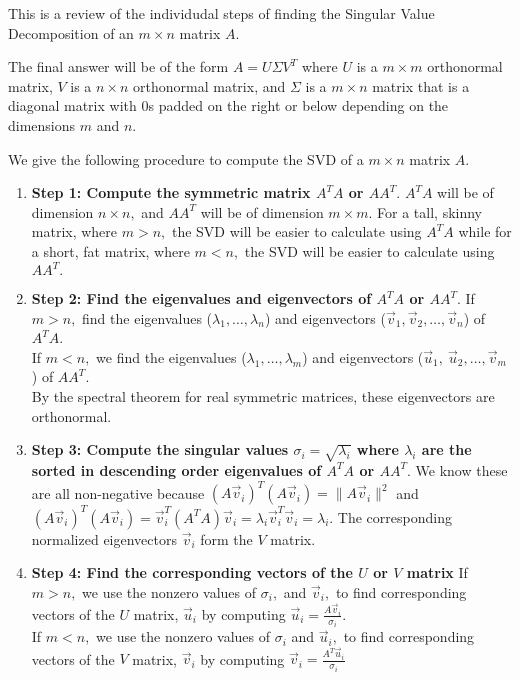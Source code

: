 

This is a review of the individudal steps of finding the Singular Value Decomposition of an $m \times n$ matrix $A.$

The final answer will be of the form $A = U \Sigma V^{T}$ where $U$ is a $m \times m$ orthonormal matrix, $V$ is a $n \times n$ orthonormal matrix, and $\Sigma$ is a $m \times n$ matrix that is a diagonal matrix with $0$s padded on the right or below depending on the dimensions $m$ and $n.$

We give the following procedure to compute the SVD of a $m \times n$ matrix $A.$

\begin{enumerate}[label=(\roman*)]
  \item \textbf{Step 1: Compute the symmetric matrix $A^{T} A$ or $A A^{T}.$} \vskip 1pt
  $A^{T}A$ will be of dimension $n \times n,$ and $AA^{T}$ will be of dimension $m \times m.$ \vskip 1pt
  For a tall, skinny matrix, where $m > n,$ the SVD will be easier to calculate using $A^{T}A$ while for a short, fat matrix, where $m < n,$ the SVD will be easier to calculate using $AA^{T}.$

  \item \textbf{Step 2: Find the eigenvalues and eigenvectors of $A^{T} A$ or $AA^{T}.$} \vskip 1pt
  If $m > n,$ find the eigenvalues ($\lambda_1, \ldots, \lambda_{n}$) and eigenvectors ($\vec{v}_1, \vec{v}_2, \ldots, \vec{v}_{n}$) of $A^TA$. \\
   If $m < n,$ we find the eigenvalues ($\lambda_1, \ldots, \lambda_{m}$) and eigenvectors ($\vec{u}_{1}, \ \vec{u}_{2}, \ldots, \vec{v}_{m}$) of $AA^{T}.$ \\
   By the spectral theorem for real symmetric matrices, these eigenvectors are orthonormal.

  \item \textbf{Step 3: Compute the singular values $\sigma_i = \sqrt{\lambda_i}$ where $\lambda_i$ are the sorted in descending order eigenvalues of $A^TA$ or $AA^{T}.$} \vskip 1pt
  We know these are all non-negative because $(A\vec{v}_i)^T(A\vec{v}_i) = \|A \vec{v}_i\|^2$ and $(A\vec{v}_i)^T(A\vec{v}_i) =\vec{v}_i^T(A^T A)\vec{v}_i = \lambda_i \vec{v}_i^T\vec{v}_i = \lambda_i$. The corresponding normalized eigenvectors $\vec{v}_i$ form the $V$ matrix.

  \item \textbf{Step 4: Find the corresponding vectors of the $U$ or $V$ matrix}  \vskip 1pt
  If $m > n,$ we use the nonzero values of $\sigma_i,$ and $\vec{v}_i,$ to find corresponding vectors of the $U$ matrix, $\vec{u}_i$ by computing $\vec{u}_i = \frac{A\vec{v}_i}{\sigma_i}$. \\
  If $m < n,$ we use the nonzero values of $\sigma_i$ and $\vec{u}_i,$ to find corresponding vectors of the $V$ matrix, $\vec{v}_i$ by computing $\vec{v}_i = \frac{A^{T} \vec{u}_i}{\sigma_i}$


\end{enumerate}
